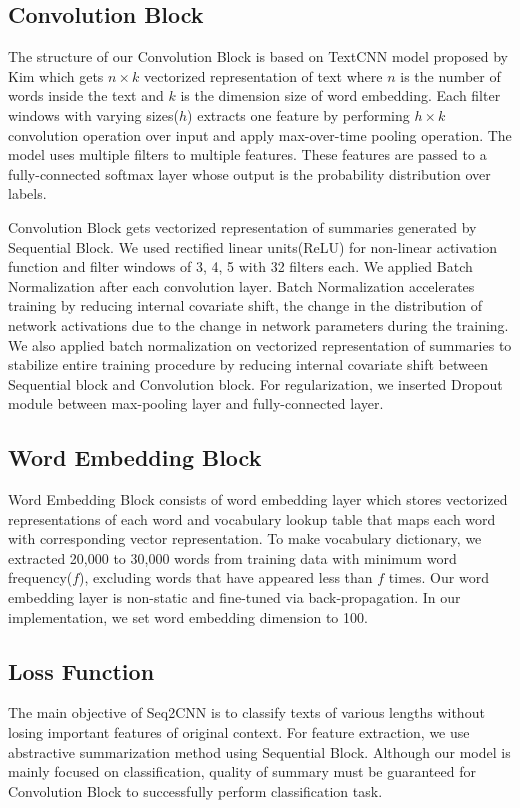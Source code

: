 \documentclass{article}
\begin{document}
\subsection{Convolution Block}
The structure of our Convolution Block is based on TextCNN model proposed by Kim\cite{DBLP:journals/corr/Kim14f} which gets $n \times k$ vectorized representation of text where $n$ is the number of words inside the text and $k$ is the dimension size of word embedding. Each filter windows with varying sizes($h$) extracts one feature by performing $h \times k$ convolution operation over input and apply max-over-time pooling operation. The model uses multiple filters to multiple features. These features are passed to a fully-connected softmax layer whose output is the probability distribution over labels.

Convolution Block gets vectorized representation of summaries generated by Sequential Block. We used rectified linear units(ReLU)\cite{DBLP:journals/corr/XuWCL15} for non-linear activation function and filter windows of 3, 4, 5 with 32 filters each. We applied Batch Normalization\cite{Ioffe:2015:BNA:3045118.3045167} after each convolution layer. Batch Normalization\cite{Ioffe:2015:BNA:3045118.3045167} accelerates training by reducing internal covariate shift\cite{Ioffe:2015:BNA:3045118.3045167}, the change in the distribution of network activations due to the change in network parameters during the training. We also applied batch normalization on vectorized representation of summaries to stabilize entire training procedure by reducing internal covariate shift between Sequential block and Convolution block. For regularization, we inserted Dropout\cite{JMLR:v15:srivastava14a} module between max-pooling layer and fully-connected layer.

\subsection{Word Embedding Block}
Word Embedding Block consists of word embedding layer which stores vectorized representations of each word and vocabulary lookup table that maps each word with corresponding vector representation. To make vocabulary dictionary, we extracted 20,000 to 30,000 words from training data with minimum word frequency($f$), excluding words that have appeared less than $f$ times. Our word embedding layer is non-static and fine-tuned via back-propagation. In our implementation, we set word embedding dimension to 100.

\subsection{Loss Function}
The main objective of Seq2CNN is to classify texts of various lengths without losing important features of original context. For feature extraction, we use abstractive summarization method using Sequential Block. Although our model is mainly focused on classification, quality of summary must be guaranteed for Convolution Block to successfully perform classification task. 
\end{document}
